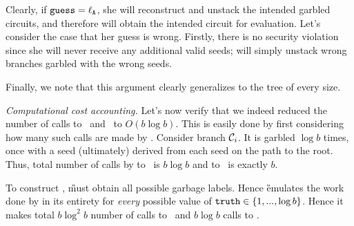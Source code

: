 Clearly, if $\mathtt{guess}=\mathtt{\ell_{A}}$, she will reconstruct and unstack the intended garbled circuits, and therefore will obtain the intended circuit for evaluation.  Let's consider the case that her guess is wrong. Firstly, there is no security violation since she will never receive any additional valid seeds; \E will simply unstack wrong branches garbled with the wrong seeds.





Finally, we note  that this argument clearly generalizes to the tree of every size.


{\em Computational cost accounting.} Let's now verify that we indeed reduced the number of calls to \Gb\ and \Ev\ to $O(b \log b)$.  This is easily done by first considering how many such calls are made by \E.  
Consider branch $\mathcal C_i$.  It is garbled $\log b$ times, once with a seed (ultimately) derived from each seed on the path to the root.   Thus, total number of calls by \E to \Gb\ is $b \log b$ and to \Ev\ is exactly $b$.  

To construct \gadget, \G must obtain all possible garbage labels.  Hence \G emulates the work done by \E in its entirety  for {\em every} possible value of $\mathtt{truth}\in\{1,...,\log b\}$.  Hence it makes total  $b \log^2 b$ number of calls to \Gb\ and $b \log b$ calls to  \Ev.  




















